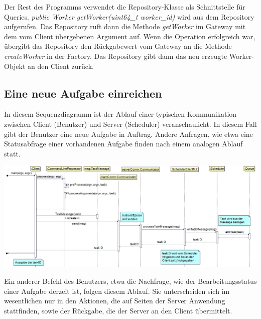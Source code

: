 \documentclass[a4paper,12pt]{article}
\begin{document}
Der Rest des Programms verwendet die Repository-Klasse als Schnittstelle für Queries. \textit{public Worker getWorker(uint64\_t worker\_id)} wird aus dem Repository aufgerufen. Das Repository ruft dann die Methode \textit{getWorker} im Gateway mit dem vom Client übergebenen Argument auf. Wenn die Operation erfolgreich war, übergibt das Repository den Rückgabewert vom Gateway an die Methode \textit{createWorker} in der Factory. Das Repository gibt dann das neu erzeugte Worker-Objekt an den Client zurück.

\clearpage

\subsection{Eine neue Aufgabe einreichen}

In diesem Sequenzdiagramm ist der Ablauf einer typischen Kommunikation zwischen Client (Benutzer) und Server (Scheduler) veranschaulicht. In diesem Fall gibt der Benutzer eine neue Aufgabe in Auftrag. Andere Anfragen, wie etwa eine Statusabfrage einer vorhandenen Aufgabe finden nach einem analogen Ablauf statt.

\includegraphics[width=\textwidth]{createTask}

Ein anderer Befehl des Benutzers, etwa die Nachfrage, wie der Bearbeitungsstatus einer Aufgabe derzeit ist, folgen diesem Ablauf. Sie unterscheiden sich im wesentlichen nur in den Aktionen, die auf Seiten der Server Anwendung stattfinden, sowie der Rückgabe, die der Server an den Client übermittelt.

\printnoidxglossaries
\end{document}

